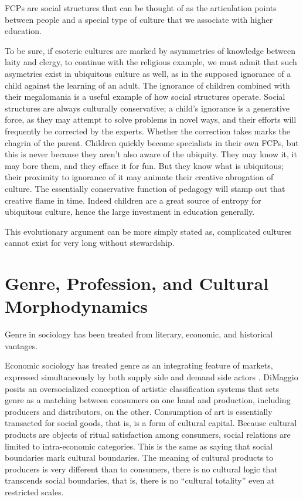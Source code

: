\documentclass[]{book}
\theoremstyle{definition}
\theoremstyle{definition}
\theoremstyle{definition}
\theoremstyle{remark}
\begin{document}
FCPs are social structures that can be thought of as the articulation
points between people and a special type of culture that we associate
with higher education.

To be sure, if esoteric cultures are marked by asymmetries of knowledge
between laity and clergy, to continue with the religious example, we
must admit that such asymetries exist in ubiquitous culture as well, as
in the supposed ignorance of a child against the learning of an adult.
The ignorance of children combined with their megalomania is a useful
example of how social structures operate. Social structures are always
culturally conservative; a child's ignorance is a generative force, as
they may attempt to solve problems in novel ways, and their efforts will
frequently be corrected by the experts. Whether the correction takes
marks the chagrin of the parent. Children quickly become specialists in
their own FCPs, but this is never because they aren't also aware of the
ubiquity. They may know it, it may bore them, and they efface it for
fun. But they know what is ubiquitous; their proximity to ignorance of
it may animate their creative abrogation of culture. The essentially
conservative function of pedagogy will stamp out that creative flame in
time. Indeed children are a great source of entropy for ubiquitous
culture, hence the large investment in education generally.

This evolutionary argument can be more simply stated as, complicated
cultures cannot exist for very long without stewardship.

\hypertarget{genre-profession-and-cultural-morphodynamics}{%
\section{Genre, Profession, and Cultural
Morphodynamics}\label{genre-profession-and-cultural-morphodynamics}}

Genre in sociology has been treated from literary, economic, and
historical vantages.

Economic sociology has treated genre as an integrating feature of
markets, expressed simultaneously by both supply side and demand side
actors \citep[441]{DiMaggio1987Classification}. DiMaggio posits an
oversocialized conception of artistic classification systems that sets
genre as a matching between consumers on one hand and production,
including producers and distributors, on the other. Consumption of art
is essentially transacted for social goods, that is, is a form of
cultural capital. Because cultural products are objects of ritual
satisfaction among consumers, social relations are limited to
intra-economic categories. This is the same as saying that social
boundaries mark cultural boundaries. The meaning of cultural products to
producers is very different than to consumers, there is no cultural
logic that transcends social boundaries, that is, there is no ``cultural
totality'' even at restricted scales.
\end{document}
